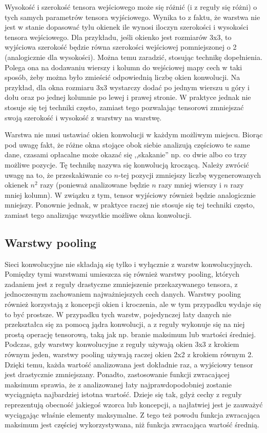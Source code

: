 Wysokość i szerokość tensora wejściowego może się różnić (i z reguły się różni) o tych samych parametrów tensora wyjściowego. Wynika to z faktu, że warstwa nie jest w stanie dopasować tylu okienek ile wynosi iloczyn szerokości i wysokości tensora wejściowego. Dla przykładu, jeśli okienko jest rozmiarów 3x3, to wyjściowa szerokość będzie równa szerokości wejściowej pomniejszonej o 2 (analogicznie dla wysokości). Można temu zaradzić, stosując technikę dopełnienia. Polega ona na dodawaniu wierszy i kolumn do wejściowej mapy cech w taki sposób, żeby można było zmieścić odpowiednią liczbę okien konwolucji. Na przykład, dla okna rozmiaru 3x3 wystarczy dodać po jednym wierszu u góry i dołu oraz po jednej kolumnie po lewej i prawej stronie. W praktyce jednak nie stosuje się tej techniki często, zamiast tego pozwalając tensorowi zmniejszać swoją szerokość i wysokość z warstwy na warstwę.

Warstwa nie musi ustawiać okien konwolucji w każdym możliwym miejscu. Biorąc pod uwagę fakt, że różne okna stojące obok siebie analizują częściowo te same dane, czasami opłacalne może okazać się ,,skakanie'' np. co dwie albo co trzy możliwe pozycje. Tę technikę nazywa się konwolucją kroczącą. Należy zwrócić uwagę na to, że przeskakiwanie co $n$-tej pozycji zmniejszy liczbę wygenerowanych okienek $n^2$ razy (ponieważ analizowane będzie $n$ razy mniej wierszy i $n$ razy mniej kolumn). W związku z tym, tensor wyjściowy również będzie analogicznie mniejszy. Ponownie jednak, w praktyce raczej nie stosuje się tej techniki często, zamiast tego analizując wszystkie możliwe okna konwolucji.

\subsection{Warstwy pooling}
Sieci konwolucyjne nie składają się tylko i wyłącznie z warstw konwolucyjnych. Pomiędzy tymi warstwami umieszcza się również warstwy pooling, których zadaniem jest z reguły drastyczne zmniejszenie przekazywanego tensora, z jednoczesnym zachowaniem najważniejszych cech danych. Warstwy pooling również korzystają z koncepcji okien i kroczenia, ale w tym przypadku wydaje się to być prostsze. W przypadku tych warstw, pojedynczej łaty danych nie przekształca się za pomocą jądra konwolucji, a z reguły wykonuje się na niej prostą operację tensorową, taką jak np. branie maksimum lub wartości średniej. Podczas, gdy warstwy konwolucyjne z reguły używają okien 3x3 z krokiem równym jeden, warstwy pooling używają raczej okien 2x2 z krokiem równym 2. Dzięki temu, każda wartość analizowana jest dokładnie raz, a wyjściowy tensor jest drastycznie zmniejszany. Ponadto, zastosowanie funkcji zwracającej maksimum sprawia, że z analizowanej łaty najprawdopodobniej zostanie wyciągnięta najbardziej istotna wartość. Dzieje się tak, gdyż cechy z reguły reprezentują obecność jakiegoś wzorca lub koncepcji, a najłatwiej jest je zauważyć wyciągając właśnie elementy maksymalne. Z tego też powodu funkcja zwracająca maksimum jest częściej wykorzystywana, niż funkcja zwracająca wartość średnią.

